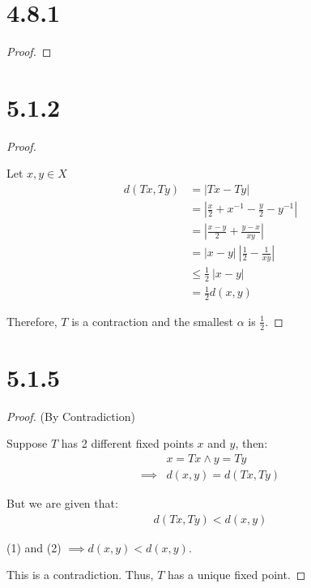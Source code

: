 \documentclass{article}
\begin{document}
\newpage

\section*{4.8.1}
\begin{proof}
  
\end{proof}

\newpage

\section*{5.1.2}
\begin{proof}
  $ $

  Let $x,y \in X$
  \begin{align*}
    d(Tx, Ty) 
    &= |Tx - Ty| \\
    &= |\frac{x}{2} + x^{-1} - \frac{y}{2} - y^{-1}| \\
    &= |\frac{x-y}{2} + \frac{y-x}{xy}| \\
    &= |x-y| \: |\frac{1}{2} - \frac{1}{xy}| \\
    &\leq \frac{1}{2} \: |x-y| \\
    &= \frac{1}{2} d(x,y)
  \end{align*}

  Therefore, $T$ is a contraction and the smallest $\alpha$ is $\frac{1}{2}$.

\end{proof}

\section*{5.1.5}
\setcounter{equation}{0}
\begin{proof} (By Contradiction)
  $ $

  Suppose $T$ has 2 different fixed points $x$ and $y$, then:
  \begin{align}
    & x = Tx \land y = Ty \nonumber \\
    \implies& d(x, y) = d(Tx, Ty) 
  \end{align}

  But we are given that:
  \begin{align}
    d(Tx, Ty) < d(x, y)
  \end{align}

  (1) and (2) $\implies d(x,y) < d(x,y)$.
  \newline

  This is a contradiction. Thus, $T$ has a unique fixed point.

\end{proof}
\end{document}
